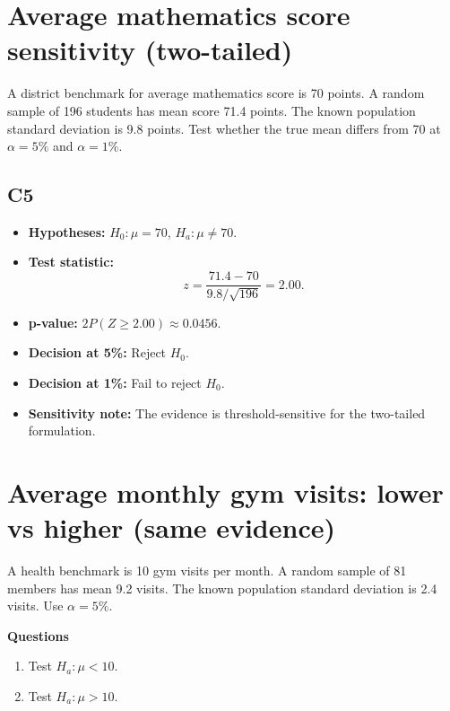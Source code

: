 \begin{center}
\hspace{0.8cm}
\end{center}


\section{Average mathematics score sensitivity (two-tailed)}
A district benchmark for average mathematics score is 70 points. A random sample of 196 students has mean score 71.4 points. The known population standard deviation is 9.8 points. Test whether the true mean differs from 70 at \(\alpha=5\%\) and \(\alpha=1\%\).

\subsection*{C5}
\begin{itemize}
    \item \textbf{Hypotheses:} \(H_0\colon \mu=70\), \(H_a\colon \mu\ne70\).
    \item \textbf{Test statistic:}
    \[
    z=\frac{71.4-70}{9.8/\sqrt{196}}=2.00.
    \]
    \item \textbf{p-value:} \(2P(Z\ge2.00)\approx0.0456\).
    \item \textbf{Decision at 5\%:} Reject \(H_0\).
    \item \textbf{Decision at 1\%:} Fail to reject \(H_0\).
    \item \textbf{Sensitivity note:} The evidence is threshold-sensitive for the two-tailed formulation.
\end{itemize}

\begin{center}
\hspace{0.8cm}
\end{center}


\section{Average monthly gym visits: lower vs higher (same evidence)}
A health benchmark is 10 gym visits per month. A random sample of 81 members has mean 9.2 visits. The known population standard deviation is 2.4 visits. Use \(\alpha=5\%\).

\textbf{Questions}
\begin{enumerate}
    \item[(a)] Test \(H_a\colon \mu<10\).
    \item[(b)] Test \(H_a\colon \mu>10\).
\end{enumerate}

